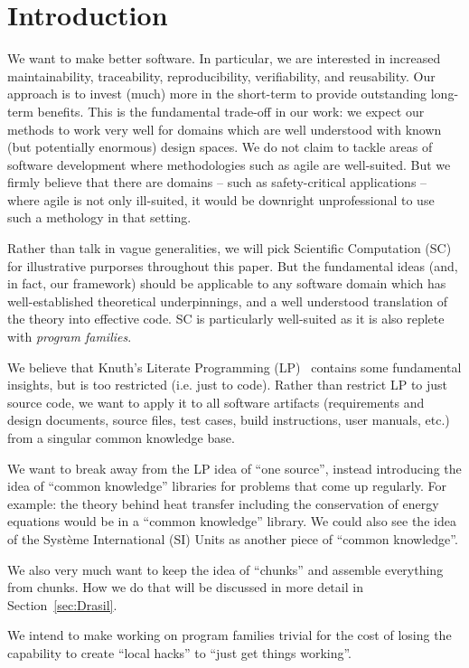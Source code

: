 \documentclass[preprint, 10pt]{sigplanconf}
\begin{document}
\section{Introduction}
\label{sec:Intro}

We want to make better software.  In particular, we are interested in
increased maintainability, traceability, reproducibility, verifiability, and
reusability.  Our approach is to invest (much) more in the short-term to provide
outstanding long-term benefits. This is the fundamental trade-off in
our work: we expect our methods to work very well for domains which are 
well understood with known (but potentially enormous) design spaces.  We do
not claim to tackle areas of software development where methodologies such
as agile are well-suited.  But we firmly believe that there are domains --
such as safety-critical applications -- where agile is not only ill-suited,
it would be downright unprofessional to use such a methology in that setting.

Rather than talk in vague generalities, we will pick Scientific Computation
(SC) for illustrative purporses throughout this paper.  But the fundamental
ideas (and, in fact, our framework) should be applicable to any software
domain which has well-established theoretical underpinnings, and a well
understood translation of the theory into effective code.  SC is particularly
well-suited as it is also replete with \emph{program families}.

We believe that Knuth's Literate Programming (LP)~\cite{Knuth1984} contains
some fundamental insights, but is too restricted (i.e. just to code).  Rather
than restrict LP to just source code, we want to apply it to all software
artifacts (requirements and design documents, source files, test cases, build
instructions, user manuals, etc.) from a singular common knowledge base.

We want to break away from the LP idea of ``one source'', instead introducing
the idea of ``common knowledge'' libraries for problems that come up regularly.
For example: the theory behind heat transfer including the conservation of
energy equations would be in a ``common knowledge'' library. We could also see
the idea of the Syst\`{e}me International (SI) Units as another piece of
``common knowledge''.

We also very much want to keep the idea of ``chunks'' and assemble everything
from chunks. How we do that will be discussed in more detail in
Section~\ref{sec:Drasil}.

We intend to make working on program families trivial for the cost of losing the
capability to create ``local hacks'' to ``just get things working''.
\end{document}
